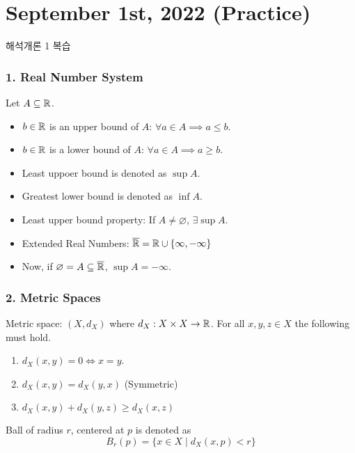 \section*{September 1st, 2022 (Practice)}

해석개론 1 복습

\subsubsection*{1. Real Number System}

Let \(A \subseteq \mathbb{R}\).

\begin{itemize}
    \item \(b \in \mathbb{R}\) is an upper bound of \(A\): \(\forall a \in A \implies a \leq b\).
    \item \(b \in \mathbb{R}\) is a lower bound of \(A\): \(\forall a \in A \implies a \geq b\).
    \item Least uppoer bound is denoted as \(\sup A\).
    \item Greatest lower bound is denoted as \(\inf A\).
    \item Least upper bound property: If \(A \neq \varnothing\), \(\exists \sup A\).
    \item Extended Real Numbers: \(\overline{\mathbb{R}} = \mathbb{R} \cup \{\infty, -\infty\}\)
    \item Now, if \(\varnothing = A \subseteq \overline{\mathbb{R}}\), \(\sup A = -\infty\).
\end{itemize}

\subsubsection*{2. Metric Spaces}

Metric space: \((X, d_X)\) where \(d_X: X \times X \rightarrow \mathbb{R}\). For all \(x, y, z \in X\) the following must hold.
\begin{enumerate}
    \item \(d_X(x, y) = 0 \iff x = y\).
    \item \(d_X(x, y) = d_X(y, x)\) (Symmetric)
    \item \(d_X(x, y) + d_X(y, z) \geq d_X(x, z)\)
\end{enumerate}

\medskip

\notation {} Ball of radius \(r\), centered at \(p\) is denoted as
\[
    B_r(p) = \{ x \in X \mid d_X(x, p) < r\}
\]

